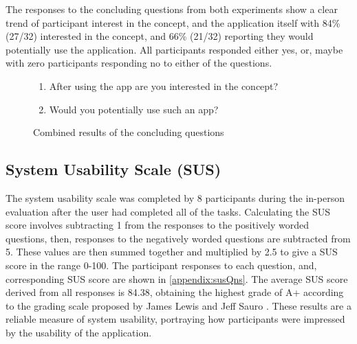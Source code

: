 The responses to the concluding questions from both experiments show a clear trend of participant interest in the concept, and the application itself with 84\% (27/32) interested in the concept, and 66\% (21/32) reporting they would potentially use the application. All participants responded either yes, or, maybe with zero participants responding no to either of the questions.

\begin{figure}[H]

\begin{enumerate}
    \item After using the app are you interested in the concept?
    \item Would you potentially use such an app?
\end{enumerate}
\caption{Combined results of the concluding questions}
\label{fig:conclAns}
\end{figure}
\FloatBarrier

\subsection{System Usability Scale (SUS)}
The system usability scale was completed by 8 participants during the in-person evaluation after the user had completed all of the tasks. Calculating the SUS score involves subtracting 1 from the responses to the positively worded questions, then, responses to the negatively worded questions are subtracted from 5. These values are then summed together and multiplied by 2.5 to give a SUS score in the range 0-100. The participant responses to each question, and, corresponding SUS score are shown in \ref{appendix:susQns}. The average SUS score derived from all responses is 84.38, obtaining the highest grade of A+ according to the grading scale proposed by James Lewis and Jeff Sauro \cite{susGrades}. These results are a reliable measure of system usability, portraying how participants were impressed by the usability of the application.

